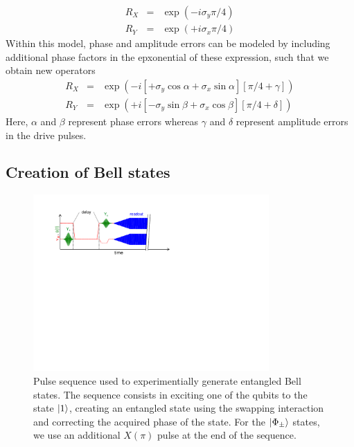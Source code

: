 \begin{eqnarray}
R_{X} & = & \exp{\left( -i \sigma_y \pi / 4\right)} \\
R_{Y} & = & \exp{\left( +i \sigma_x \pi / 4\right)} 
\end{eqnarray}
Within this model, phase and amplitude errors can be modeled by including additional phase factors in the epxonential of these expression, such that we obtain new operators
\begin{eqnarray}
R_{X} & = & \exp{\left( -i \left[+\sigma_y\cos{\alpha}+\sigma_x\sin{\alpha} \right] \left[\pi / 4+\gamma\right]\right)} \\
R_{Y} & = & \exp{\left( +i \left[-\sigma_y\sin{\beta}+\sigma_x\cos{\beta}\right] \left[\pi / 4+\delta\right]\right)} 
\end{eqnarray}
Here, $\alpha$ and $\beta$ represent phase errors whereas $\gamma$ and $\delta$ represent amplitude errors in the drive pulses. 

\subsection{Creation of Bell states}

\begin{figure}
	\centering
	\includegraphics[width=9cm]{"./material/figures/measurement/bell_state_creation"}
	\caption[]{Pulse sequence used to experimentially generate entangled Bell states. The sequence consists in exciting one of the qubits to the state $\left| 1 \right>$, creating an entangled state using the swapping interaction and correcting the acquired phase of the state. For the $\left| \Phi_\pm \right>$ states, we use an additional $X(\pi)$ pulse at the end of the sequence.}
	\label{fig:bell_generation_pulse_sequence}
\end{figure}

